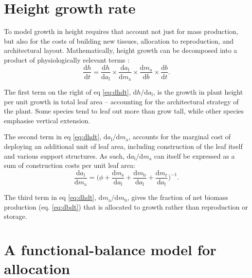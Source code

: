 \documentclass[10pt,twoside]{article}
\begin{document}
\section{Height growth rate}\label{height-growth-rate}

To model growth in height requires that account not just for mass
production, but also for the costs of building new tissues, allocation
to reproduction, and architectural layout. Mathematically, height growth
can be decomposed into a product of physiologically relevant terms
\citep{Falster-2011}:
\begin{equation} \label{eq:dhdt}
\frac{\textrm{d}h}{\textrm{d}t}= \frac{\textrm{d}h}{\textrm{d}a_\textrm{l}}
\times \frac{\textrm{d}a_\textrm{l}}{\textrm{d}m_\textrm{a}}
\times \frac{\textrm{d}m_\textrm{a}}{\textrm{d}b}
\times \frac{\textrm{d}b}{\textrm{d}t}.
\end{equation}

The first term on the right of eq \ref{eq:dhdt},
\(\textrm{d}h / \textrm{d}a_\textrm{l}\), is the growth in plant height
per unit growth in total leaf area -- accounting for the architectural
strategy of the plant. Some species tend to leaf out more than grow
tall, while other species emphasise vertical extension.

The second term in eq \ref{eq:dhdt},
\(\textrm{d}a_\textrm{l} / \textrm{d}m_\textrm{a}\), accounts for the
marginal cost of deploying an additional unit of leaf area, including
construction of the leaf itself and various support structures. As such,
\(\textrm{d}a_\textrm{l} / \textrm{d}m_\textrm{a}\) can itself be
expressed as a sum of construction costs per unit leaf area:
\begin{equation}\label{eq:daldmt}
\frac{\textrm{d}a_\textrm{l}}{\textrm{d}m_\textrm{a}}
= \big(\phi
 + \frac{\textrm{d}m_\textrm{s}}{\textrm{d}a_\textrm{l}} + \frac{\textrm{d}m_\textrm{b}}{\textrm{d}a_\textrm{l}} + \frac{\textrm{d}m_\textrm{r}}{\textrm{d}a_\textrm{l}}\big)^{-1}.
\end{equation}

The third term in eq \ref{eq:dhdt},
\(\textrm{d}m_\textrm{a} / \textrm{d}m_\textrm{b}\), gives the fraction
of net biomass production (eq. \ref{eq:dbdt}) that is allocated to
growth rather than reproduction or storage.

\section{A functional-balance model for
allocation}\label{a-functional-balance-model-for-allocation}
\end{document}
